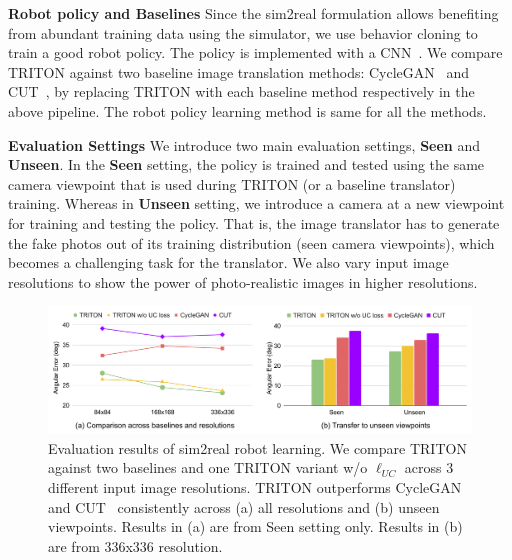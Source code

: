 \documentclass{article}
\begin{document}
\textbf{Robot policy and Baselines}
Since the sim2real formulation allows benefiting from abundant training data using the simulator, we use behavior cloning to train a good robot policy.
The policy is implemented with a CNN~\cite{dqn}.
We compare TRITON against two baseline image translation methods: CycleGAN~\cite{cyclegan} and CUT~\cite{cut}, by replacing TRITON with each baseline method respectively in the above pipeline. The robot policy learning method is same for all the methods.

\textbf{Evaluation Settings} We introduce two main evaluation settings, \textbf{Seen} and \textbf{Unseen}. In the \textbf{Seen} setting, the policy is trained and tested using the same camera viewpoint that is used during TRITON (or a baseline translator) training. Whereas in \textbf{Unseen} setting, we introduce a camera at a new viewpoint for training and testing the policy. That is, the image translator has to generate the fake photos out of its training distribution (seen camera viewpoints), which becomes a challenging task for the translator. We also vary input image resolutions to show the power of photo-realistic images in higher resolutions.

\begin{figure}[tbhp]
    \centering
    \vspace{-3pt}
    \includegraphics[width=.95\textwidth]{../images/sim2real_res.pdf}
    \vspace{-5pt}
    \caption{Evaluation results of sim2real robot learning. We compare TRITON against two baselines and one TRITON variant w/o $\ell_{UC}$ across 3 different input image resolutions. TRITON outperforms CycleGAN~\cite{cyclegan} and CUT~\cite{cut} consistently across (a) all resolutions and (b) unseen viewpoints. Results in (a) are from Seen setting only. Results in (b) are from 336x336 resolution. }
    \label{fig:sim2real}
    \vspace{-3pt}
\end{figure}
\end{document}
